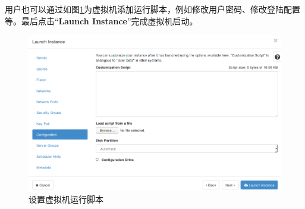 \documentclass[12pt]{article}
\begin{document}
用户也可以通过如图\ref{fig:launchInstanceConfig}为虚拟机添加运行脚本，例如修改用户密码、修改登陆配置等。最后点击``\textbf{Launch Instance}''完成虚拟机启动。
\begin{figure}[!htb]
\centering
\includegraphics[width=6in]{./figures/launchInstanceConfig}
\caption{设置虚拟机运行脚本}
\label{fig:launchInstanceConfig}
\end{figure}
\end{document}
